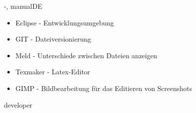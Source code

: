 \documentclass[twoside]{report}
\begin{document}
\begin{shownto}{-, manualDE}
\begin{itemize}
\item{Eclipse - Entwicklungsumgebung}
\item{GIT - Dateiversionierung}
\item{Meld - Unterschiede zwischen Dateien anzeigen}
\item{Texmaker - Latex-Editor}
\item{GIMP - Bildbearbeitung für das Editieren von Screenshots}
\end{itemize}
\nsecend



\nsecend %

\end{shownto} %
\begin{shownto}{developer}


\end{shownto}
\end{document}
